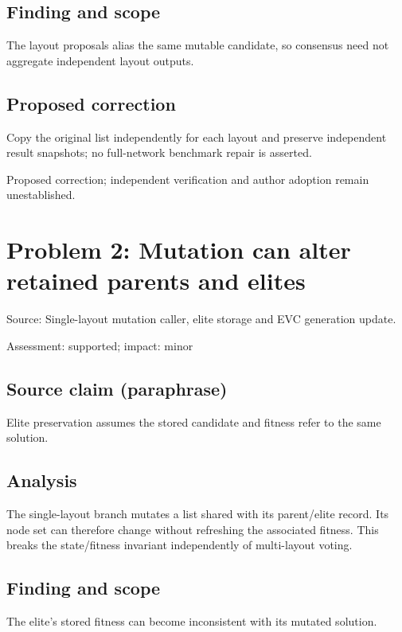 \documentclass[11pt]{article}
\begin{document}
\subsection*{Finding and scope}

The layout proposals alias the same mutable candidate, so consensus need not aggregate independent layout outputs.

\subsection*{Proposed correction}

Copy the original list independently for each layout and preserve independent result snapshots; no full-network benchmark repair is asserted.

Proposed correction; independent verification and author adoption remain unestablished.

\section*{Problem 2: Mutation can alter retained parents and elites}

Source: Single-layout mutation caller, elite storage and EVC generation update.

Assessment: supported; impact: minor

\subsection*{Source claim (paraphrase)}

Elite preservation assumes the stored candidate and fitness refer to the same solution.

\subsection*{Analysis}

The single-layout branch mutates a list shared with its parent/elite record. Its node set can therefore change without refreshing the associated fitness. This breaks the state/fitness invariant independently of multi-layout voting.

\subsection*{Finding and scope}

The elite’s stored fitness can become inconsistent with its mutated solution.
\end{document}
